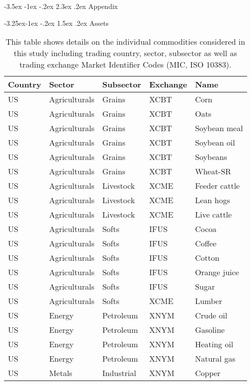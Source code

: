 \documentclass[11pt, letterpaper, doublespacing]{article}
\makeatletter
\renewcommand{\section}{\@startsection {section}{1}{\z@}%
  {-3.5ex \@plus -1ex \@minus -.2ex}%
  {2.3ex \@plus.2ex}%
  {\centering\normalfont\large\bfseries}}
\renewcommand{\subsection}{\@startsection{subsection}{2}{\z@}%
  {-3.25ex\@plus -1ex \@minus -.2ex}%
  {1.5ex \@plus .2ex}%
  {\normalfont\large\slshape}}
\makeatother
\begin{document}
\section{Appendix}\label{appendix}

\subsection{Assets}\label{assets}

\begingroup\fontsize{8}{10}\selectfont

\begin{longtabu} to 
\caption{\label{tab:appendix_assets}This table shows details on the individual commodities considered in this study including trading country, sector, subsector as well as trading exchange Market Identifier Codes (MIC, ISO 10383).}\\
\toprule
Country & Sector & Subsector & Exchange & Name\\
\midrule
US & Agriculturals & Grains & XCBT & Corn\\
US & Agriculturals & Grains & XCBT & Oats\\
US & Agriculturals & Grains & XCBT & Soybean meal\\
US & Agriculturals & Grains & XCBT & Soybean oil\\
US & Agriculturals & Grains & XCBT & Soybeans\\

US & Agriculturals & Grains & XCBT & Wheat-SR\\
US & Agriculturals & Livestock & XCME & Feeder cattle\\
US & Agriculturals & Livestock & XCME & Lean hogs\\
US & Agriculturals & Livestock & XCME & Live cattle\\
US & Agriculturals & Softs & IFUS & Cocoa\\

US & Agriculturals & Softs & IFUS & Coffee\\
US & Agriculturals & Softs & IFUS & Cotton\\
US & Agriculturals & Softs & IFUS & Orange juice\\
US & Agriculturals & Softs & IFUS & Sugar\\
US & Agriculturals & Softs & XCME & Lumber\\

US & Energy & Petroleum & XNYM & Crude oil\\
US & Energy & Petroleum & XNYM & Gasoline\\
US & Energy & Petroleum & XNYM & Heating oil\\
US & Energy & Petroleum & XNYM & Natural gas\\
US & Metals & Industrial & XNYM & Copper\\


\end{longtabu}
\end{document}
